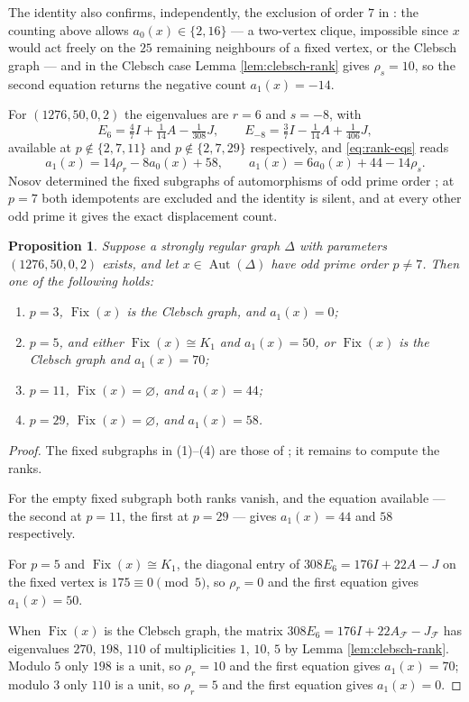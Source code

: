 \documentclass[11pt]{article}
\theoremstyle{plain}
\newtheorem{proposition}[theorem]{Proposition}
\theoremstyle{remark}
\newcommand{\Aut}{\operatorname{Aut}}
\newcommand{\Fix}{\operatorname{Fix}}
\begin{document}
The identity also confirms, independently, the exclusion of order $7$ in \cite[Lemma 2.5]{MakhnevNosov2004}:
the counting above allows $a_0(x)\in\{2,16\}$
--- a two-vertex clique, impossible since $x$ would act freely on the $25$ remaining neighbours of a fixed vertex, or the Clebsch graph \cite[\S2]{MakhnevNosov2004} ---
and in the Clebsch case Lemma \ref{lem:clebsch-rank} gives $\rho_s=10$,
so the second equation returns the negative count $a_1(x)=-14$.

For $(1276,50,0,2)$ the eigenvalues are $r=6$ and $s=-8$, with
\[
 E_{6}=\tfrac47I+\tfrac1{14}A-\tfrac1{308}J,
 \qquad
 E_{-8}=\tfrac37I-\tfrac1{14}A+\tfrac1{406}J,
\]
available at $p\notin\{2,7,11\}$ and $p\notin\{2,7,29\}$ respectively, and \eqref{eq:rank-eqs} reads
\[
 a_1(x)=14\rho_r-8a_0(x)+58,
 \qquad
 a_1(x)=6a_0(x)+44-14\rho_s.
\]
Nosov determined the fixed subgraphs of automorphisms of odd prime order \cite{Nosov2016};
at $p=7$ both idempotents are excluded and the identity is silent,
and at every other odd prime it gives the exact displacement count.

\begin{proposition}\label{prop:1276}
Suppose a strongly regular graph $\Delta$ with parameters $(1276,50,0,2)$ exists,
and let $x\in\Aut(\Delta)$ have odd prime order $p\neq 7$.
Then one of the following holds:
\begin{enumerate}
\item[(1)] $p=3$, $\Fix(x)$ is the Clebsch graph, and $a_1(x)=0$;
\item[(2)] $p=5$, and either $\Fix(x)\cong K_1$ and $a_1(x)=50$, or $\Fix(x)$ is the Clebsch graph and $a_1(x)=70$;
\item[(3)] $p=11$, $\Fix(x)=\varnothing$, and $a_1(x)=44$;
\item[(4)] $p=29$, $\Fix(x)=\varnothing$, and $a_1(x)=58$.
\end{enumerate}
\end{proposition}

\begin{proof}
The fixed subgraphs in (1)--(4) are those of \cite{Nosov2016}; it remains to compute the ranks.

For the empty fixed subgraph both ranks vanish,
and the equation available --- the second at $p=11$, the first at $p=29$ --- gives $a_1(x)=44$ and $58$ respectively.

For $p=5$ and $\Fix(x)\cong K_1$, the diagonal entry of $308E_6=176I+22A-J$ on the fixed vertex is $175\equiv 0\pmod 5$,
so $\rho_r=0$ and the first equation gives $a_1(x)=50$.

When $\Fix(x)$ is the Clebsch graph,
the matrix $308E_6=176I+22A_{\mathcal F}-J_{\mathcal F}$ has eigenvalues $270$, $198$, $110$ of multiplicities $1$, $10$, $5$ by Lemma \ref{lem:clebsch-rank}.
Modulo $5$ only $198$ is a unit, so $\rho_r=10$ and the first equation gives $a_1(x)=70$;
modulo $3$ only $110$ is a unit, so $\rho_r=5$ and the first equation gives $a_1(x)=0$.
\end{proof}
\end{document}
